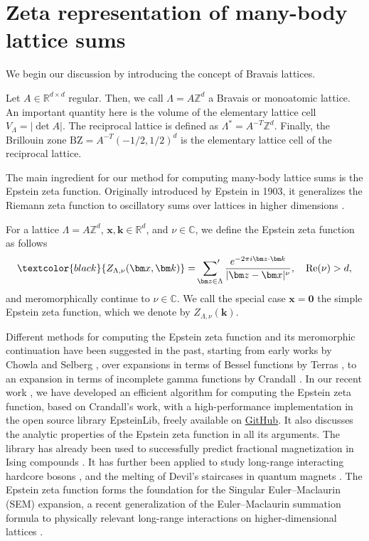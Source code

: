 \documentclass[]{amsart}
\numberwithin{mythm}{section}
\newcommand{\zeps}[3]{Z_{#1}(#2,#3)}
\newcommand{\sums}{\sideset{}{'} \sum}
\newcommand{\new}[1]{{\textcolor{black}{#1}}}
\begin{document}
\section{Zeta representation of many-body lattice sums}
\label{sec:zeta_representation}
We begin our discussion by introducing the concept of Bravais lattices. 
\begin{definition}[Lattices]
    Let $A\in \mathds R^{d\times d}$ regular. Then, we call $\Lambda = A\mathds Z^d$ a Bravais or monoatomic lattice. An important quantity here is the volume of the elementary lattice cell $V_\Lambda = \vert \det A\vert$. The reciprocal lattice is defined as $\Lambda^\ast = A^{-T} \mathds Z^d$. Finally, the Brillouin zone $\mathrm{BZ} = A^{-T}(-1/2,1/2)^d$ is the elementary lattice cell of the reciprocal lattice.
\end{definition}

The main ingredient for our method for computing many-body lattice sums is the Epstein zeta function. Originally introduced by Epstein in 1903, it generalizes the Riemann zeta function to oscillatory sums over lattices in higher dimensions \cite{epstein1903theorieI,epstein1903theorieII}. 

\begin{definition}
    For a lattice $\Lambda =A \mathds Z^d$, $\bm x,\bm k\in \mathds R^d$, and $\nu\in \mathds C$, we define the Epstein zeta function as follows
    \[
   \new{\zeps{\Lambda,\nu}{\bm x}{\bm k}}=
    \sums_{\bm z \in \Lambda} \frac{e^{-2\pi i \bm z\cdot \bm k}}{\vert \bm z-\bm x \vert^\nu},\quad \mathrm{Re}(\nu)>d,
    \]
    and meromorphically continue to $\nu\in \mathds  C$. We call the special case $\bm x=\bm 0$ the simple Epstein zeta function, which we denote by $Z_{\Lambda,\nu}(\bm k)$.
\end{definition}

Different methods for computing the Epstein zeta function and its meromorphic continuation have been suggested in the past, starting from early works by Chowla and Selberg \cite{chowla1949epstein}, over expansions in terms of Bessel functions by Terras \cite{terras1973bessel}, to an expansion in terms of incomplete gamma functions by Crandall \cite{crandall2012unified}. In our recent work \cite{buchheit2024epstein}, we have developed an efficient algorithm for computing the Epstein zeta function, based on Crandall's work, with a high-performance implementation in the open source library EpsteinLib, freely available on \href{https://github.com/epsteinlib/epsteinlib}{GitHub}. It also discusses the analytic properties of the Epstein zeta function in all its arguments. The library has already been used to successfully predict fractional magnetization in Ising compounds \cite{yadav2024observation}. It has further been applied to study long-range interacting hardcore bosons \cite{koziol2024quantum}, and the melting of Devil's staircases in quantum magnets \cite{koziol2025melting}. The Epstein zeta function forms the foundation for the Singular Euler--Maclaurin (SEM) expansion, a recent generalization of the Euler--Maclaurin summation formula to physically relevant long-range interactions on higher-dimensional lattices \cite{buchheit2022singular,buchheit2022efficient}.
\end{document}
